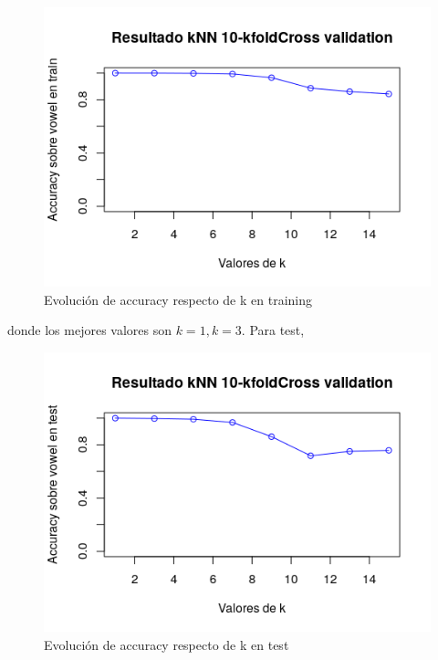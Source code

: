 \begin{figure}[H] %
	\centering
	\includegraphics[scale=0.8]{k-knn-10kf-tr.png}  %
	\caption{Evolución de accuracy respecto de k en training} 
	\label{fig:k-knn-10kf-tr}
\end{figure}

donde los mejores valores son $k=1, k=3$. Para test,

\begin{figure}[H] %
	\centering
	\includegraphics[scale=0.8]{k-knn-10kf-tst.png}  %
	\caption{Evolución de accuracy respecto de k en test} 
	\label{fig:k-knn-10kf-tst}
\end{figure}

